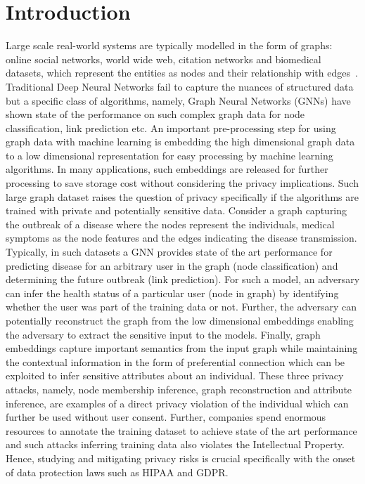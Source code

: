 \section{Introduction}\label{introduction}

Large scale real-world systems are typically modelled in the form of graphs: online social networks, world wide web, citation networks and biomedical datasets, which represent the entities as nodes and their relationship with edges~\cite{zhou2018graph}.
Traditional Deep Neural Networks fail to capture the nuances of structured data but a specific class of algorithms, namely, Graph Neural Networks (GNNs) have shown state of the performance on such complex graph data for node classification, link prediction etc.
An important pre-processing step for using graph data with machine learning is embedding the high dimensional graph data to a low dimensional representation for easy processing by machine learning algorithms.
In many applications, such embeddings are released for further processing to save storage cost without considering the privacy implications.
Such large graph dataset raises the question of privacy specifically if the algorithms are trained with private and potentially sensitive data.
Consider a graph capturing the outbreak of a disease where the nodes represent the individuals, medical symptoms as the node features and the edges indicating the disease transmission.
Typically, in such datasets a GNN provides state of the art performance for predicting disease for an arbitrary user in the graph (node classification) and determining the future outbreak (link prediction).
For such a model, an adversary can infer the health status of a particular user (node in graph) by identifying whether the user was part of the training data or not.
Further, the adversary can potentially reconstruct the graph from the low dimensional embeddings enabling the adversary to extract the sensitive input to the models.
Finally, graph embeddings capture important semantics from the input graph while maintaining the contextual information in the form of preferential connection which can be exploited to infer sensitive attributes about an individual.
These three privacy attacks, namely, node membership inference, graph reconstruction and attribute inference, are examples of a direct privacy violation of the individual which can further be used without user consent. %
Further, companies spend enormous resources to annotate the training dataset to achieve state of the art performance and such attacks inferring training data also violates the Intellectual Property.
Hence, studying and mitigating privacy risks is crucial specifically with the onset of data protection laws such as HIPAA and GDPR.

